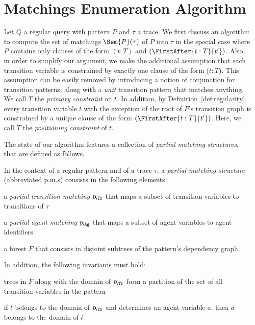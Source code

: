 \section{Matchings Enumeration Algorithm}\label{ap:algo}


Let $Q$ a regular query with pattern $P$ and $\tau$ a trace. We first
discuss an algorithm to compute the set of matchings $\Sem{P}(\tau)$
of $P$ into $\tau$ in the special case where $P$ contains only clauses
of the form $(t:T)$ and $(\FirstAfter{t:T}{t'})$. Also, in order to
simplify our argument, we make the additional assumption that each
transition variable is constrained by exactly one clause of the form
($t:T$). This assumption can be easily removed by introducing a notion
of conjunction for transition patterns, along with a \emph{unit}
transition pattern that matches anything. We call $T$ the
\emph{primary constraint} on $t$. In addition, by
Definition~\ref{def:regularity}, every transition variable $t$ with the
exception of the root of $P$'s transition graph is constrained by a
unique clause of the form $(\FirstAfter{t:T}{t'})$. Here, we call $T$ the
\emph{positioning constraint} of $t$.

\bigskip

\newcommand{\PMS}{p.m.s}

The state of our algorithm features a collection of \emph{partial
  matching structures}, that are defined as follows.
\begin{definition}
  In the context of a regular pattern and of a trace $\tau$, a
  \emph{partial matching structure} (abbreviated \PMS) consists in the
  following elements:
  \begin{inparaenum}[(1)]
  \item a \emph{partial transition matching} $p_{\!\Tr}$ that maps a
    subset of transition variables to transitions of $\tau$
  \item a \emph{partial agent matching} $p_{\!\Ag}$ that maps a
    subset of agent variables to agent identifiers
  \item a forest $F$ that consists in disjoint subtrees of the
    pattern's dependency graph.
  \end{inparaenum}

  In addition, the following invariants must hold:
  \begin{inparaenum}[(1)]
  \item trees in $F$ along with the domain of $p_{\!\Tr}$ form a
    partition of the set of all transition variables in the pattern
  \item if $t$ belongs to the domain of $p_{\!\Tr}$ and determines an
    agent variable $a$, then $a$ belongs to the domain of $l$.
  \end{inparaenum}
\end{definition}

